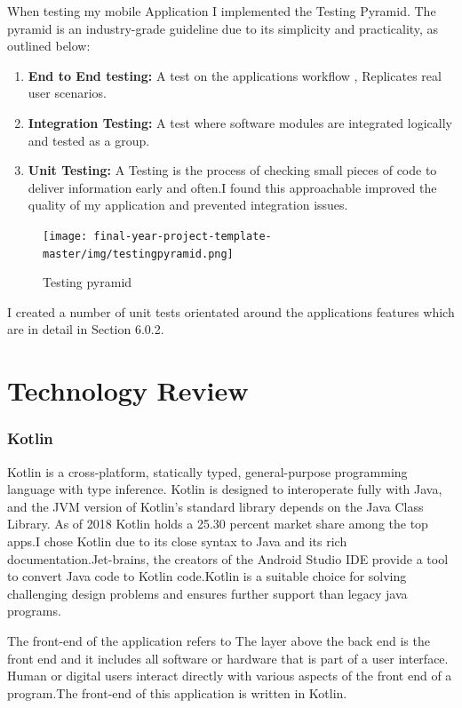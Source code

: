 When testing my mobile Application I  implemented the Testing Pyramid. The pyramid is an industry-grade guideline due to its simplicity and practicality, as outlined below:

\begin{enumerate}
  \item \textbf{End to End testing:} A test on the applications workflow , Replicates real user scenarios.
  \item \textbf{Integration Testing:} A  test  where software modules are integrated logically and tested as a group.
  \item \textbf{Unit Testing:} A Testing is the process of checking small pieces of code to deliver information early and often.I found this approachable improved the quality of my application and prevented integration issues.
\end{enumerate}

\begin{figure}[H]
  \centering
    \texttt{[image: final-year-project-template-master/img/testingpyramid.png]}
     \caption{Testing pyramid }
\end{figure}

I created a number of unit tests orientated around the applications features which are in detail in Section 6.0.2.


\chapter{Technology Review}

\subsection{Kotlin}
Kotlin is a cross-platform, statically typed, general-purpose programming language with type inference. Kotlin is designed to interoperate fully with Java, and the JVM version of Kotlin's standard library depends on the Java Class Library. As of 2018 Kotlin holds a 25.30 percent market share among the top apps\cite{kotlinstats}.I chose Kotlin due to its close syntax to Java and its rich documentation.Jet-brains, the creators of the Android Studio IDE provide a tool to convert Java code to Kotlin code.Kotlin is a suitable  choice for solving challenging design problems and ensures further support than legacy java programs.



The front-end of the application refers to  The layer above the back end is the front end and it includes all software or hardware that is part of a user interface. Human or digital users interact directly with various aspects of the front end of a program.The front-end of this application is written in Kotlin.


